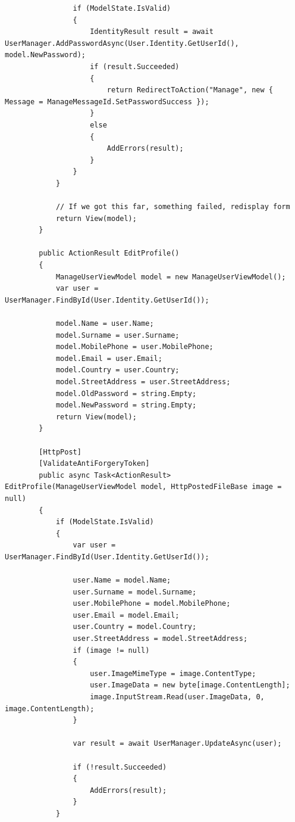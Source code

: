 \documentclass[14pt,a4paper]{extreport}
\begin{document}
\begin{lstlisting}
                if (ModelState.IsValid)
                {
                    IdentityResult result = await UserManager.AddPasswordAsync(User.Identity.GetUserId(), model.NewPassword);
                    if (result.Succeeded)
                    {
                        return RedirectToAction("Manage", new { Message = ManageMessageId.SetPasswordSuccess });
                    }
                    else
                    {
                        AddErrors(result);
                    }
                }
            }

            // If we got this far, something failed, redisplay form
            return View(model);
        }

        public ActionResult EditProfile()
        {
            ManageUserViewModel model = new ManageUserViewModel();
            var user = UserManager.FindById(User.Identity.GetUserId());

            model.Name = user.Name;
            model.Surname = user.Surname;
            model.MobilePhone = user.MobilePhone;
            model.Email = user.Email;
            model.Country = user.Country;
            model.StreetAddress = user.StreetAddress;
            model.OldPassword = string.Empty;
            model.NewPassword = string.Empty;
            return View(model);
        }

        [HttpPost]
        [ValidateAntiForgeryToken]
        public async Task<ActionResult> EditProfile(ManageUserViewModel model, HttpPostedFileBase image = null)
        {
            if (ModelState.IsValid)
            {
                var user = UserManager.FindById(User.Identity.GetUserId());

                user.Name = model.Name;
                user.Surname = model.Surname;
                user.MobilePhone = model.MobilePhone;
                user.Email = model.Email;
                user.Country = model.Country;
                user.StreetAddress = model.StreetAddress;
                if (image != null)
                {
                    user.ImageMimeType = image.ContentType;
                    user.ImageData = new byte[image.ContentLength];
                    image.InputStream.Read(user.ImageData, 0, image.ContentLength);
                }

                var result = await UserManager.UpdateAsync(user);

                if (!result.Succeeded)
                {
                    AddErrors(result);
                }
            }


\end{lstlisting}
\end{document}
